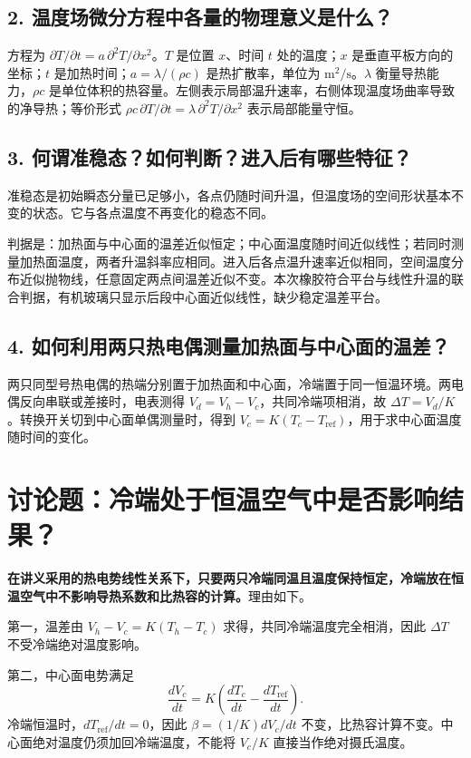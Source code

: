 \documentclass[UTF8,a4paper,11pt]{ctexart}
\begin{document}
\subsection*{2. 温度场微分方程中各量的物理意义是什么？}
方程为 $\partial T/\partial t=a\,\partial^2T/\partial x^2$。$T$ 是位置 $x$、时间 $t$ 处的温度；$x$ 是垂直平板方向的坐标；$t$ 是加热时间；$a=\lambda/(\rho c)$ 是热扩散率，单位为 $\mathrm{m^2/s}$。$\lambda$ 衡量导热能力，$\rho c$ 是单位体积的热容量。左侧表示局部温升速率，右侧体现温度场曲率导致的净导热；等价形式 $\rho c\,\partial T/\partial t=\lambda\,\partial^2T/\partial x^2$ 表示局部能量守恒。

\subsection*{3. 何谓准稳态？如何判断？进入后有哪些特征？}
准稳态是初始瞬态分量已足够小，各点仍随时间升温，但温度场的空间形状基本不变的状态。它与各点温度不再变化的稳态不同。

判据是：加热面与中心面的温差近似恒定；中心面温度随时间近似线性；若同时测量加热面温度，两者升温斜率应相同。进入后各点温升速率近似相同，空间温度分布近似抛物线，任意固定两点间温差近似不变。本次橡胶符合平台与线性升温的联合判据，有机玻璃只显示后段中心面近似线性，缺少稳定温差平台。

\subsection*{4. 如何利用两只热电偶测量加热面与中心面的温差？}
两只同型号热电偶的热端分别置于加热面和中心面，冷端置于同一恒温环境。两电偶反向串联或差接时，电表测得 $V_d=V_h-V_c$，共同冷端项相消，故 $\Delta T=V_d/K$。转换开关切到中心面单偶测量时，得到 $V_c=K(T_c-T_{\mathrm{ref}})$，用于求中心面温度随时间的变化。

\section{讨论题：冷端处于恒温空气中是否影响结果？}
\textbf{在讲义采用的热电势线性关系下，只要两只冷端同温且温度保持恒定，冷端放在恒温空气中不影响导热系数和比热容的计算。}理由如下。

第一，温差由 $V_h-V_c=K(T_h-T_c)$ 求得，共同冷端温度完全相消，因此 $\Delta T$ 不受冷端绝对温度影响。

第二，中心面电势满足
\[
\frac{dV_c}{dt}=K\left(\frac{dT_c}{dt}-\frac{dT_{\mathrm{ref}}}{dt}\right).
\]
冷端恒温时，$dT_{\mathrm{ref}}/dt=0$，因此 $\beta=(1/K)dV_c/dt$ 不变，比热容计算不变。中心面绝对温度仍须加回冷端温度，不能将 $V_c/K$ 直接当作绝对摄氏温度。
\end{document}

